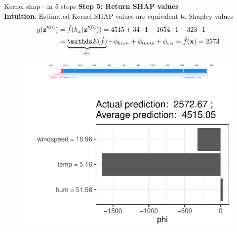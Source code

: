 \documentclass[10pt,compress,t,notes=noshow, xcolor=table]{beamer}
\begin{document}
\begin{frame}{Kernel shap - in 5 steps}
\textbf{Step 5: Return SHAP values}\\\medskip
\textbf{Intuition}: Estimated Kernel SHAP values are equivalent to Shapley values 
\begin{align*}
g(\mathbf{z}^{\prime (8)}) &= \fh(h_x(\mathbf{z}^{\prime (8)}) ) = 4515 + 34 \cdot 1 - 1654 \cdot 1 - 323 \cdot 1\\&= \underbrace{\E(\fh)}_{\phi_0} + \phi_{hum} + \phi_{temp} + \phi_{ws} = \fh(\xv) = 2573
\end{align*}

\begin{figure}
    \centering
    \includegraphics[width=\columnwidth]{figure_man/exSHAP.png}
    \includegraphics[trim={10 17 5 5},clip, width=0.4\linewidth]{figure/shapley2shap.pdf}
\end{figure}


\end{frame}

\end{document}
